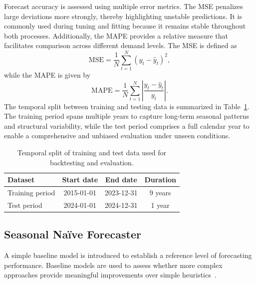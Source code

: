 Forecast accuracy is assessed using multiple error metrics. The \ac{MSE} penalizes large deviations more strongly, thereby highlighting unstable predictions. It is commonly used during tuning and fitting because it remains stable throughout both processes. Additionally, the \ac{MAPE} provides a relative measure that facilitates comparison across different demand levels. The \ac{MSE} is defined as
\begin{equation}
    \mathrm{MSE} = \frac{1}{N} \sum_{t=1}^{N} (y_t - \hat{y}_t)^2,
    \label{eq:mse}
\end{equation}
while the \ac{MAPE} is given by
\begin{equation}
    \mathrm{MAPE} = \frac{1}{N} \sum_{t=1}^{N} \left| \frac{y_t - \hat{y}_t}{y_t} \right|.
    \label{eq:mape}
\end{equation}
The temporal split between training and testing data is summarized in Table~\ref{tab:data_split}. The training period spans multiple years to capture long-term seasonal patterns and structural variability, while the test period comprises a full calendar year to enable a comprehensive and unbiased evaluation under unseen conditions.
\begin{table}[H]
    \centering
    \caption{Temporal split of training and test data used for backtesting and evaluation.}
    \label{tab:data_split}
    \begin{tabular}{lccc}
        \toprule
        \textbf{Dataset} & \textbf{Start date} & \textbf{End date} & \textbf{Duration}\\
        \midrule
        Training period & 2015-01-01 & 2023-12-31 & 9 years\\
        Test period     & 2024-01-01 & 2024-12-31 & 1 year\\
        \bottomrule
    \end{tabular}
\end{table}

\subsection{Seasonal Na\"{i}ve Forecaster}
\label{subsec:baseline}
A simple baseline model is introduced to establish a reference level of forecasting performance. Baseline models are used to assess whether more complex approaches provide meaningful improvements over simple heuristics~\cite{beck_2025_naive}.

